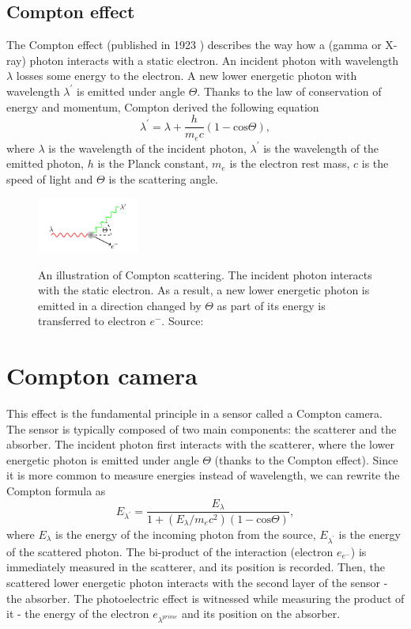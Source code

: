 \subsection{Compton effect}
The Compton effect (published in 1923 \cite{}) describes the way how a (gamma or X-ray) photon interacts with a static electron. An incident photon with wavelength $\lambda$ losses some energy to the electron. A new lower energetic photon with wavelength $\lambda^{\prime}$ is emitted under angle $\Theta$. Thanks to the law of conservation of energy and momentum, Compton derived the following equation
\begin{equation}
    \lambda^{\prime} = \lambda + \frac{h}{m_{e}c}(1-\mathrm{cos} \Theta),
\end{equation}
where $\lambda$ is the wavelength of the incident photon, $\lambda^{\prime}$ is the wavelength of the emitted photon, $h$ is the Planck constant, $m_{e}$ is the electron rest mass, $c$ is the speed of light and $\Theta$ is the scattering angle.

\begin{figure}[!h]
    \centering
    \includegraphics[width=0.3\textwidth]{./fig/photos/scattering.png}
    \label{fig:scattering}
    \caption{An illustration of Compton scattering. The incident photon interacts with the static electron. As a result, a new lower energetic photon is emitted in a direction changed by $\Theta$ as part of its energy is transferred to electron $e^{-}$. Source: \cite{baca2021gamma}}
\end{figure}

\section{Compton camera}
This effect is the fundamental principle in a sensor called a Compton camera. 
The sensor is typically composed of two main components: the scatterer and the absorber. 
The incident photon first interacts with the scatterer, where the lower energetic photon is emitted under angle $\Theta$ (thanks to the Compton effect). 
Since it is more common to measure energies instead of wavelength, we can rewrite the Compton formula as
\begin{equation}
E_{\lambda^{\prime}} = \frac{E_{\lambda}}{  1 + (E_{\lambda} / m_{e}c^{2}) (1 - \mathrm{cos} \Theta)},
\end{equation}
where $E_{\lambda}$ is the energy of the incoming photon from the source, $E_{\lambda^{\prime}}$ is the energy of the scattered photon.  
The bi-product of the interaction (electron $e_{e^{-}}$) is immediately measured in the scatterer, and its position is recorded.
Then, the scattered lower energetic photon interacts with the second layer of the sensor - the absorber. 
The photoelectric effect is witnessed while measuring the product of it - the energy of the electron $e_{\lambda^{prime}}$ and its position on the absorber.

